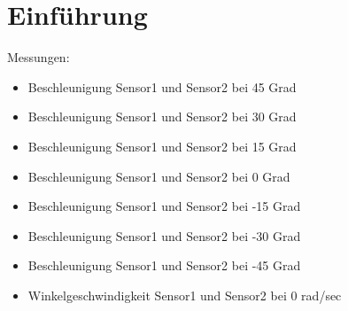 \section{Einführung}

Messungen:
\begin{itemize}
\item Beschleunigung Sensor1 und Sensor2 bei 45 Grad
\item Beschleunigung Sensor1 und Sensor2 bei 30 Grad
\item Beschleunigung Sensor1 und Sensor2 bei 15 Grad
\item Beschleunigung Sensor1 und Sensor2 bei 0  Grad
\item Beschleunigung Sensor1 und Sensor2 bei -15 Grad
\item Beschleunigung Sensor1 und Sensor2 bei -30 Grad
\item Beschleunigung Sensor1 und Sensor2 bei -45 Grad
\item Winkelgeschwindigkeit Sensor1 und Sensor2 bei 0 rad/sec
\end{itemize}